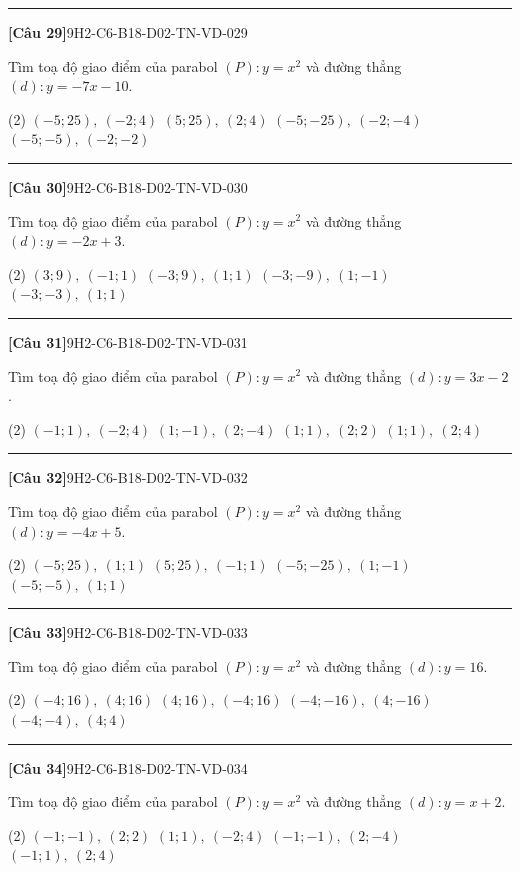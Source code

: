 \documentclass[12pt,a4paper]{article}
\newif\ifloigiai
\newenvironment{cauhoi}[2]{%
  \par\medskip\noindent\rule{\textwidth}{0.4pt}\par\nopagebreak
  \noindent\textbf{[#1]}\hfill{\scriptsize\ttfamily #2}\par\nopagebreak\smallskip}{\par}
\newcommand{\dapan}[1]{\ifloigiai\par\smallskip\noindent\textit{Đáp án:} \textbf{#1}\par\fi}
\begin{document}
\begin{cauhoi}{Câu 29}{9H2-C6-B18-D02-TN-VD-029}
Tìm toạ độ giao điểm của parabol $(P): y=x^{2}$ và đường thẳng $(d): y=-7x-10$.
\begin{tasks}(2)
\task $(-5;25),\ (-2;4)$
\task $(5;25),\ (2;4)$
\task $(-5;-25),\ (-2;-4)$
\task $(-5;-5),\ (-2;-2)$
\end{tasks}
\dapan{A}
\end{cauhoi}
\begin{cauhoi}{Câu 30}{9H2-C6-B18-D02-TN-VD-030}
Tìm toạ độ giao điểm của parabol $(P): y=x^{2}$ và đường thẳng $(d): y=-2x+3$.
\begin{tasks}(2)
\task $(3;9),\ (-1;1)$
\task $(-3;9),\ (1;1)$
\task $(-3;-9),\ (1;-1)$
\task $(-3;-3),\ (1;1)$
\end{tasks}
\dapan{B}
\end{cauhoi}
\begin{cauhoi}{Câu 31}{9H2-C6-B18-D02-TN-VD-031}
Tìm toạ độ giao điểm của parabol $(P): y=x^{2}$ và đường thẳng $(d): y=3x-2$.
\begin{tasks}(2)
\task $(-1;1),\ (-2;4)$
\task $(1;-1),\ (2;-4)$
\task $(1;1),\ (2;2)$
\task $(1;1),\ (2;4)$
\end{tasks}
\dapan{D}
\end{cauhoi}
\begin{cauhoi}{Câu 32}{9H2-C6-B18-D02-TN-VD-032}
Tìm toạ độ giao điểm của parabol $(P): y=x^{2}$ và đường thẳng $(d): y=-4x+5$.
\begin{tasks}(2)
\task $(-5;25),\ (1;1)$
\task $(5;25),\ (-1;1)$
\task $(-5;-25),\ (1;-1)$
\task $(-5;-5),\ (1;1)$
\end{tasks}
\dapan{A}
\end{cauhoi}
\begin{cauhoi}{Câu 33}{9H2-C6-B18-D02-TN-VD-033}
Tìm toạ độ giao điểm của parabol $(P): y=x^{2}$ và đường thẳng $(d): y=16$.
\begin{tasks}(2)
\task $(-4;16),\ (4;16)$
\task $(4;16),\ (-4;16)$
\task $(-4;-16),\ (4;-16)$
\task $(-4;-4),\ (4;4)$
\end{tasks}
\dapan{A}
\end{cauhoi}
\begin{cauhoi}{Câu 34}{9H2-C6-B18-D02-TN-VD-034}
Tìm toạ độ giao điểm của parabol $(P): y=x^{2}$ và đường thẳng $(d): y=x+2$.
\begin{tasks}(2)
\task $(-1;-1),\ (2;2)$
\task $(1;1),\ (-2;4)$
\task $(-1;-1),\ (2;-4)$
\task $(-1;1),\ (2;4)$
\end{tasks}
\dapan{D}
\end{cauhoi}
\end{document}
